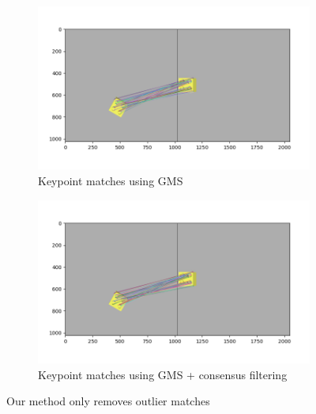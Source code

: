 \begin{figure}[H]
    \centering
    \begin{subfigure}[t]{0.49\textwidth}
        \includegraphics[width=\textwidth]{figures/inliers-gms.png}
        \caption{Keypoint matches using GMS}
        \label{fig:inliers-gms}
    \end{subfigure}
    \hfill
    \begin{subfigure}[t]{0.49\textwidth}
        \includegraphics[width=\textwidth]{figures/inliers-gms+ours.png}
        \caption{Keypoint matches using GMS + consensus filtering}
        \label{fig:inliers-gms+filter}
    \end{subfigure}
    \caption{Our method only removes outlier matches}
    \label{fig:consensus-filtering2}
\end{figure}

